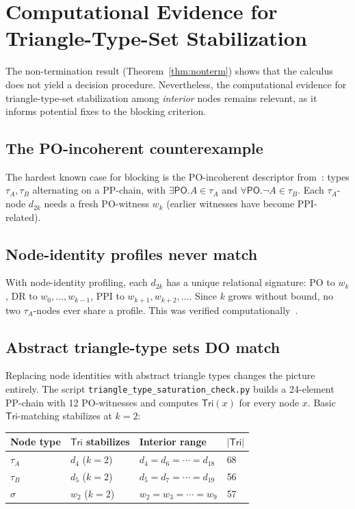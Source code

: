 \documentclass[a4paper,11pt]{article}
\theoremstyle{definition}
\newcommand{\PO}{\ensuremath{\mathsf{PO}}}
\newcommand{\Tri}{\ensuremath{\mathsf{Tri}}}
\begin{document}
\section{Computational Evidence for Triangle-Type-Set Stabilization}
\label{sec:evidence}

The non-termination result (Theorem~\ref{thm:nonterm}) shows
that the calculus does not yield a decision procedure.
Nevertheless, the computational evidence for triangle-type-set
stabilization among \emph{interior} nodes remains relevant,
as it informs potential fixes to the blocking criterion.

\subsection{The PO-incoherent counterexample}

The hardest known case for blocking is the PO-incoherent
descriptor from~\cite{TwoTier}: types $\tau_A, \tau_B$
alternating on a PP-chain, with $\exists\PO.A \in \tau_A$
and $\forall\PO.\neg A \in \tau_B$.  Each $\tau_A$-node
$d_{2k}$ needs a fresh PO-witness $w_k$ (earlier witnesses
have become PPI-related).

\subsection{Node-identity profiles never match}

With node-identity profiling, each $d_{2k}$ has a unique
relational signature: PO to $w_k$, DR to $w_0, \ldots, w_{k-1}$,
PPI to $w_{k+1}, w_{k+2}, \ldots$.  Since $k$ grows without
bound, no two $\tau_A$-nodes ever share a profile.  This was
verified computationally~\cite{ProfileCheck}.

\subsection{Abstract triangle-type sets DO match}

Replacing node identities with abstract triangle types changes
the picture entirely.  The script
\texttt{triangle\_type\_saturation\_check.py} builds a
24-element PP-chain with 12 PO-witnesses and computes
$\Tri(x)$ for every node $x$.  Basic $\Tri$-matching
stabilizes at $k = 2$:

\medskip
\begin{center}
\begin{tabular}{llll}
\toprule
Node type & $\Tri$ stabilizes & Interior range & $|\Tri|$ \\
\midrule
$\tau_A$ & $d_4$ ($k{=}2$) &
  $d_4 = d_6 = \cdots = d_{18}$ & 68 \\
$\tau_B$ & $d_5$ ($k{=}2$) &
  $d_5 = d_7 = \cdots = d_{19}$ & 56 \\
$\sigma$ & $w_2$ ($k{=}2$) &
  $w_2 = w_3 = \cdots = w_9$ & 57 \\
\bottomrule
\end{tabular}
\end{center}
\end{document}
